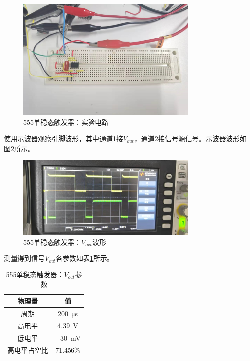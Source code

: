 \documentclass[UTF8]{ctexart}
\numberwithin{figure}{subsection}
\numberwithin{table}{subsection}
\numberwithin{equation}{subsection}
\begin{document}
\begin{figure}[H]
    \begin{center}
        \includegraphics[width=0.8\textwidth]{555/monostable/circuit.jpg}
    \end{center}
    \caption{555单稳态触发器：实验电路}
    \label{monostable exp cir}
\end{figure}

\par 使用示波器观察引脚波形，其中通道1接\(V_{out}\)，通道2接信号源信号。示波器波形如图\ref{monostable vout osci}所示。

\begin{figure}[H]
    \begin{center}
        \includegraphics[width=0.8\textwidth]{555/monostable/vout.jpg}
    \end{center}
    \caption{555单稳态触发器：\(V_{out}\)波形}
    \label{monostable vout osci}
\end{figure}

测量得到信号\(V_{out}\)各参数如表\ref{monostable vout table}所示。

\begin{table}
    \begin{center}
        \begin{tabular}{c | c}
            物理量 & 值 \\
            \hline
            周期 & \SI{200}{\micro\second} \\
            高电平 & \SI{4.39}{\volt} \\
            低电平 & \SI{-30}{\milli\volt} \\
            高电平占空比 & 71.456\% \\
        \end{tabular}
        \label{monostable vout table}
        \caption{555单稳态触发器：\(V_{out}\)参数}
    \end{center}
\end{table}
\end{document}
